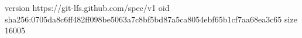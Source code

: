 version https://git-lfs.github.com/spec/v1
oid sha256:0705da8c6ff482ff098be5063a7c8bf5bd87a5ca8054ebf65b1cf7aa68ea3c65
size 16005
